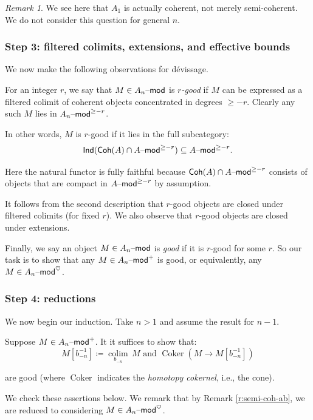 \documentclass[reqno,11pt]{amsart}
\numberwithin{equation}{subsection}
\theoremstyle{remark}
\newtheorem{rem}[thm]{Remark}
\newcommand{\on}{\operatorname}
\newcommand{\mathendash}{\text{\textendash}}
\newcommand{\Coker}{\on{Coker}}
\renewcommand{\mod}{\mathendash\mathsf{mod}}
\newcommand{\colim}{\on{colim}}
\newcommand{\Ind}{\mathsf{Ind}}
\newcommand{\heart}{\heartsuit}
\newcommand{\Coh}{\mathsf{Coh}}
\renewcommand{\subset}{\subseteq}
\begin{document}
\begin{rem}

We see here that $A_1$ is actually coherent, not merely semi-coherent.
We do not consider this question for general $n$.

\end{rem}

\subsubsection{Step 3: filtered colimits, extensions, and effective bounds} 
We now make the following observations for d\'evissage.

For an integer $r$, we say that $M \in A_n\mod$ is \emph{$r$-good} if $M$ can be 
expressed as a filtered colimit of coherent objects concentrated in 
degrees $\geq -r$. Clearly any such $M$ lies in $A_n\mod^{\geq -r}$.

In other words, $M$ is $r$-good if it lies in the full subcategory:
%
\[
\Ind(\Coh(A) \cap A\mod^{\geq -r}) \subset A\mod^{\geq -r}.
\]

\noindent Here the natural functor is fully faithful because
$\Coh(A) \cap A\mod^{\geq -r}$ consists of objects that are 
compact in $A\mod^{\geq -r}$ by assumption.

It follows from the second description that $r$-good objects are closed
under filtered colimits (for fixed $r$). We also observe that $r$-good objects
are closed under extensions.

Finally, we say an object $M \in A_n\mod$ is \emph{good} if it is
$r$-good for some $r$. So our task is to show that any $M \in A_n\mod^+$ 
is good, or equivalently, any $M \in A_n\mod^{\heart}$.

\subsubsection{Step 4: reductions}

We now begin our induction. Take $n>1$ and assume the result for $n-1$.

Suppose $M \in A_n\mod^+$. 
It it suffices to show that:
%
\[
M[b_{-n}^{-1}] \coloneqq \underset{b_{-n}}{\colim} \, M \text{ and }
\Coker(M \to M[b_{-n}^{-1}])
\]

\noindent are good (where $\Coker$ indicates the \emph{homotopy cokernel}, 
i.e., the cone).

We check these assertions below. We remark that by Remark \ref{r:semi-coh-ab},
we are reduced to considering $M \in A_n\mod^{\heart}$.
\end{document}
